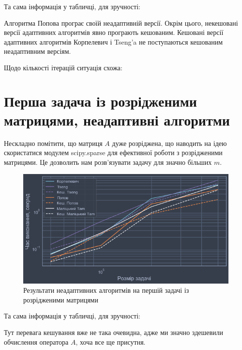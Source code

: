 Та сама інформація у табличці, для зручності:



Алгоритма Попова програє своїй неадаптивній версії. Окрім цього, некешовані версії адаптивних алгоритмів явно програють кешованим. Кешовані версії адаптивних алгоритмів Корпелевич і Tseng'a не поступаються кешованим неадаптивним версіям. \medskip

Щодо кількості ітерацій ситуація схожа:



\section{Перша задача із розрідженими матрицями, неадаптивні алгоритми}

Нескладно помітити, що матриця $A$ дуже розріджена, що наводить на ідею скористатися модулем scipy.sparse для ефективної роботи з розрідженими матрицями. Це дозволить нам розв'язувати задачу для значно більших $m$.

\begin{figure}[H]
    \centering
    \includegraphics[width=\textwidth]{img/1/sparse/time.png}
    \caption{Результати неадаптивних алгоритмів на першій задачі із розрідженими матрицями}
\end{figure}

Та сама інформація у табличці, для зручності:





\begin{remark}
    Тут перевага кешування вже не така очевидна, адже ми значно здешевили обчислення оператора $A$, хоча все ще присутня.
\end{remark}

